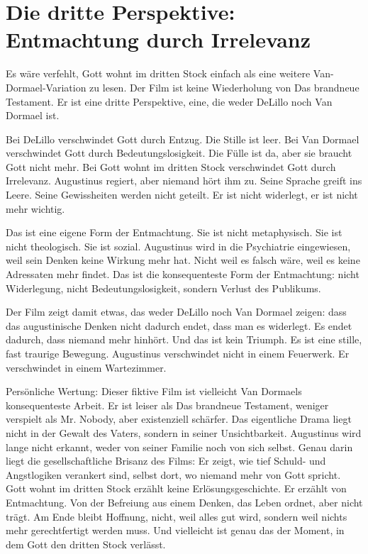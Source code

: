 \documentclass[
  ngerman,
]{article}
\begin{document}
\section{\texorpdfstring{\hfill\break
}{ }}\label{section}

\section{Die dritte Perspektive: Entmachtung durch
Irrelevanz}\label{die-dritte-perspektive-entmachtung-durch-irrelevanz}

Es wäre verfehlt, Gott wohnt im dritten Stock einfach als eine weitere
Van-Dormael-Variation zu lesen. Der Film ist keine Wiederholung von Das
brandneue Testament. Er ist eine dritte Perspektive, eine, die weder
DeLillo noch Van Dormael ist.

Bei DeLillo verschwindet Gott durch Entzug. Die Stille ist leer. Bei Van
Dormael verschwindet Gott durch Bedeutungslosigkeit. Die Fülle ist da,
aber sie braucht Gott nicht mehr. Bei Gott wohnt im dritten Stock
verschwindet Gott durch Irrelevanz. Augustinus regiert, aber niemand
hört ihm zu. Seine Sprache greift ins Leere. Seine Gewissheiten werden
nicht geteilt. Er ist nicht widerlegt, er ist nicht mehr wichtig.

Das ist eine eigene Form der Entmachtung. Sie ist nicht metaphysisch.
Sie ist nicht theologisch. Sie ist sozial. Augustinus wird in die
Psychiatrie eingewiesen, weil sein Denken keine Wirkung mehr hat. Nicht
weil es falsch wäre, weil es keine Adressaten mehr findet. Das ist die
konsequenteste Form der Entmachtung: nicht Widerlegung, nicht
Bedeutungslosigkeit, sondern Verlust des Publikums.

Der Film zeigt damit etwas, das weder DeLillo noch Van Dormael zeigen:
dass das augustinische Denken nicht dadurch endet, dass man es
widerlegt. Es endet dadurch, dass niemand mehr hinhört. Und das ist kein
Triumph. Es ist eine stille, fast traurige Bewegung. Augustinus
verschwindet nicht in einem Feuerwerk. Er verschwindet in einem
Wartezimmer.

Persönliche Wertung: Dieser fiktive Film ist vielleicht Van Dormaels
konsequenteste Arbeit. Er ist leiser als Das brandneue Testament,
weniger verspielt als Mr. Nobody, aber existenziell schärfer. Das
eigentliche Drama liegt nicht in der Gewalt des Vaters, sondern in
seiner Unsichtbarkeit. Augustinus wird lange nicht erkannt, weder von
seiner Familie noch von sich selbst. Genau darin liegt die
gesellschaftliche Brisanz des Films: Er zeigt, wie tief Schuld- und
Angstlogiken verankert sind, selbst dort, wo niemand mehr von Gott
spricht. Gott wohnt im dritten Stock erzählt keine Erlösungsgeschichte.
Er erzählt von Entmachtung. Von der Befreiung aus einem Denken, das
Leben ordnet, aber nicht trägt. Am Ende bleibt Hoffnung, nicht, weil
alles gut wird, sondern weil nichts mehr gerechtfertigt werden muss. Und
vielleicht ist genau das der Moment, in dem Gott den dritten Stock
verlässt.
\end{document}
